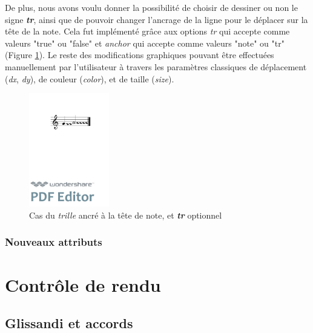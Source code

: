 \documentclass{article}
\newenvironment{gmncode}	{\vspace{-2mm}\small\verbatim}{\endverbatim\vspace{-2mm}}
\begin{document}
De plus, nous avons voulu donner la possibilité de choisir de dessiner ou non le signe \textit{\textbf{tr}}, ainsi que de pouvoir changer l'ancrage de la ligne pour le déplacer sur la tête de la note. Cela fut implémenté grâce aux options \emph{tr} qui accepte comme valeurs "true" ou "false" et \emph{anchor} qui accepte comme valeurs "note" ou "tr" (Figure \ref{fig:trillanchor}). Le reste des modifications graphiques pouvant être effectuées manuellement par l'utilisateur à travers les paramètres classiques de déplacement (\textit{dx}, \textit{dy}), de couleur (\textit{color}), et de taille (\textit{size}).

\begin{figure}[h]
\centering
\begin{gmncode}
[ \trill<tr="false", anchor="note">( {g} {a/2} ) ]
\end{gmncode}
\includegraphics[width=35mm]{img/trillanchor.pdf}
\caption{Cas du \emph{trille} ancré à la tête de note, et \textit{\textbf{tr}} optionnel}
\label{fig:trillanchor}
\end{figure}

\subsubsection{Nouveaux attributs}\label{subsubsec:attributs}



\section{Contr\^ole de rendu}\label{sec:controleRendu}

\subsection{Glissandi et accords}\label{subsec:glissandiAccords}
\end{document}
